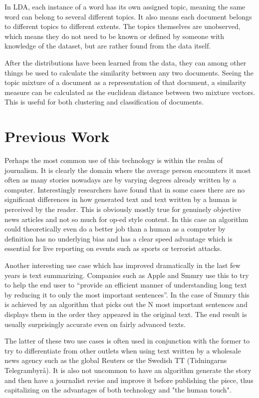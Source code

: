 \documentclass[12pt,a4paper,utf8]{article}
\begin{document}
In LDA, each instance of a word has its own assigned topic, meaning the same word can belong to several different topics. It also means each document belongs to different topics to different extents. The topics themselves are unobserved, which means they do not need to be known or defined by someone with knowledge of the dataset, but are rather found from the data itself.

After the distributions have been learned from the data, they can among other things be used to calculate the similarity between any two documents. Seeing the topic mixture of a document as a representation of that document, a similarity measure can be calculated as the euclidean distance between two mixture vectors. This is useful for both clustering and classification of documents.

\section{Previous Work}
Perhaps the most common use of this technology is within the realm of journalism. It is clearly the domain where the average person encounters it most often as many stories nowadays are by varying degrees already written by a computer. Interestingly researchers have found that in some cases there are no significant differences in how generated text and text written by a human is perceived by the reader\autocite{RobotJournalist}. This is obviously mostly true for genuinely objective news articles and not so much for op-ed style content. In this case an algorithm could theoretically even do a better job than a human as a computer by definition has no underlying bias and has a clear speed advantage which is essential for live reporting on events such as sports or terrorist attacks.

Another interesting use case which has improved dramatically in the last few years is text summarizing. Companies such as Apple and Smmry use this to try to help the end user to ``provide an efficient manner of understanding long text by reducing it to only the most important sentences''\autocite{Smmry}. In the case of Smmry this is achieved by an algorithm that picks out the N most important sentences and displays them in the order they appeared in the original text. The end result is usually surprisingly accurate even on fairly advanced texts.

The latter of these two use cases is often used in conjunction with the former to try to differentiate from other outlets when using text written by a wholesale news agency such as the global Reuters or the Swedish TT (Tidningarns Telegrambyrå). It is also not uncommon to have an algorithm generate the story and then have a journalist revise and improve it before publishing the piece, thus capitalizing on the advantages of both technology and "the human touch"\autocite{RobotJournalist}.
\end{document}
